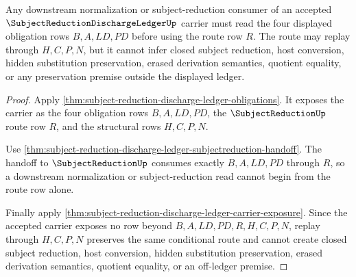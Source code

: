\begin{theorem}
\label{thm:subject-reduction-discharge-conditional-normalization}
Any downstream normalization or subject-reduction consumer of an accepted $\SubjectReductionDischargeLedgerUp$ carrier must read the four displayed obligation rows $B,A,LD,PD$ before using the route row $R$. The route may replay through $H,C,P,N$, but it cannot infer closed subject reduction, host conversion, hidden substitution preservation, erased derivation semantics, quotient equality, or any preservation premise outside the displayed ledger.
\end{theorem}
\begin{proof}
Apply \autoref{thm:subject-reduction-discharge-ledger-obligations}. It exposes the carrier as the four obligation rows $B,A,LD,PD$, the $\SubjectReductionUp$ route row $R$, and the structural rows $H,C,P,N$.

Use \autoref{thm:subject-reduction-discharge-ledger-subjectreduction-handoff}. The handoff to $\SubjectReductionUp$ consumes exactly $B,A,LD,PD$ through $R$, so a downstream normalization or subject-reduction read cannot begin from the route row alone.

Finally apply \autoref{thm:subject-reduction-discharge-ledger-carrier-exposure}. Since the accepted carrier exposes no row beyond $B,A,LD,PD,R,H,C,P,N$, replay through $H,C,P,N$ preserves the same conditional route and cannot create closed subject reduction, host conversion, hidden substitution preservation, erased derivation semantics, quotient equality, or an off-ledger premise.
\end{proof}

